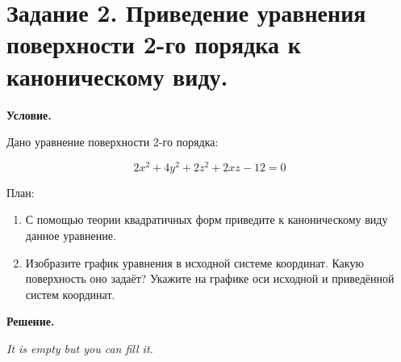 \section{Задание 2. Приведение уравнения поверхности 2-го порядка к каноническому виду.}

\textbf{Условие.}

Дано уравнение поверхности 2-го порядка:

\[2x^2 + 4y^2 + 2z^2 + 2xz -12 = 0\]

План:
\begin{enumerate}
    \item С помощью теории квадратичных форм приведите к каноническому виду данное уравнение.
    \item Изобразите график уравнения в исходной системе координат.
Какую поверхность оно задаёт? Укажите на графике оси исходной и приведённой систем координат.
\end{enumerate}

\vspace{10mm}
\textbf{Решение.}

\textit{It is empty but you can fill it.}
